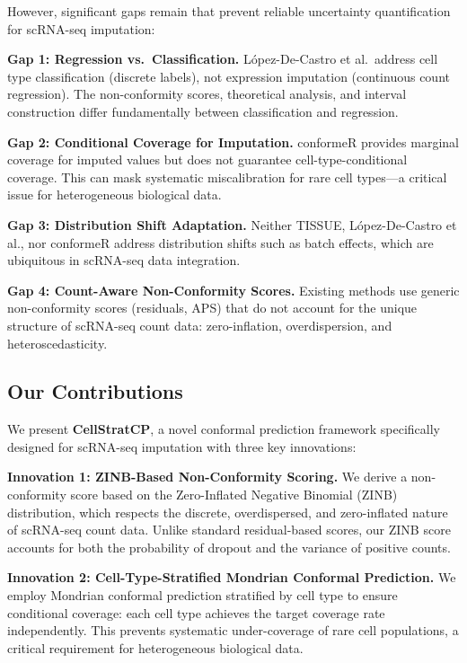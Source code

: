 \documentclass{article}
\begin{document}
However, significant gaps remain that prevent reliable uncertainty quantification for scRNA-seq imputation:

\textbf{Gap 1: Regression vs.~Classification.} L{\'o}pez-De-Castro et al.~address cell type classification (discrete labels), not expression imputation (continuous count regression). The non-conformity scores, theoretical analysis, and interval construction differ fundamentally between classification and regression.

\textbf{Gap 2: Conditional Coverage for Imputation.} conformeR provides marginal coverage for imputed values but does not guarantee cell-type-conditional coverage. This can mask systematic miscalibration for rare cell types---a critical issue for heterogeneous biological data.

\textbf{Gap 3: Distribution Shift Adaptation.} Neither TISSUE, L{\'o}pez-De-Castro et al., nor conformeR address distribution shifts such as batch effects, which are ubiquitous in scRNA-seq data integration.

\textbf{Gap 4: Count-Aware Non-Conformity Scores.} Existing methods use generic non-conformity scores (residuals, APS) that do not account for the unique structure of scRNA-seq count data: zero-inflation, overdispersion, and heteroscedasticity.

\subsection{Our Contributions}

We present \textbf{CellStratCP}, a novel conformal prediction framework specifically designed for scRNA-seq imputation with three key innovations:

\textbf{Innovation 1: ZINB-Based Non-Conformity Scoring.} We derive a non-conformity score based on the Zero-Inflated Negative Binomial (ZINB) distribution, which respects the discrete, overdispersed, and zero-inflated nature of scRNA-seq count data. Unlike standard residual-based scores, our ZINB score accounts for both the probability of dropout and the variance of positive counts.

\textbf{Innovation 2: Cell-Type-Stratified Mondrian Conformal Prediction.} We employ Mondrian conformal prediction stratified by cell type to ensure conditional coverage: each cell type achieves the target coverage rate independently. This prevents systematic under-coverage of rare cell populations, a critical requirement for heterogeneous biological data.
\end{document}
